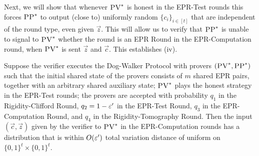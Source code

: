 Next, we will show that whenever $\textsc{PV}^*$ is honest in the EPR-Test rounds this forces $\textsc{PP}^*$ to output (close to) uniformly random $\{c_i\}_{i\in [t]}$ that are independent of the round type, even given $\vec{z}$. This will allow us to verify that $\textsc{PP}^*$ is unable to signal to $\textsc{PV}^*$ whether the round is an EPR Round in the EPR-Computation round, when $\textsc{PV}^*$ is sent $\vec{z}$ and $\vec{c}$. This establishes (iv). 


\begin{lemma}\label{lem:ci-unif}
Suppose the verifier executes the Dog-Walker Protocol with provers $(\textsc{PV}^*,\textsc{PP}^*)$ such that the initial shared state of the provers consists of $m$ shared EPR pairs, together with an arbitrary shared auxiliary state; $\textsc{PV}^*$ plays the honest strategy in the EPR-Test rounds; the provers are accepted with probability $q_1$ in the Rigidity-Clifford Round, $q_2 = 1-\varepsilon'$ in the EPR-Test Round, $q_3$ in the EPR-Computation Round, and $q_4$ in the Rigidity-Tomography Round. Then the input $(\vec{c},\vec{z})$ given by the verifier to $\textsc{PV}^*$ in the EPR-Computation rounds has a distribution that is within $O(\varepsilon')$ total variation distance of uniform on $\{0,1\}^t\times\{0,1\}^t$. 
\end{lemma}

